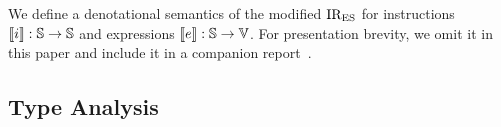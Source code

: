 We define a denotational semantics of the modified ${\text{IR}_\text{ES}}$ for instructions
$\llbracket{i}\rrbracket: \mathbb{S} \rightarrow \mathbb{S}$ and expressions $\llbracket{e}\rrbracket: \mathbb{S}
\rightarrow \mathbb{V}$.  For presentation brevity, we omit it in this paper and
include it in a companion report~.
% 
% 
% 


\subsection{Type Analysis}\label{sec:analysis}

